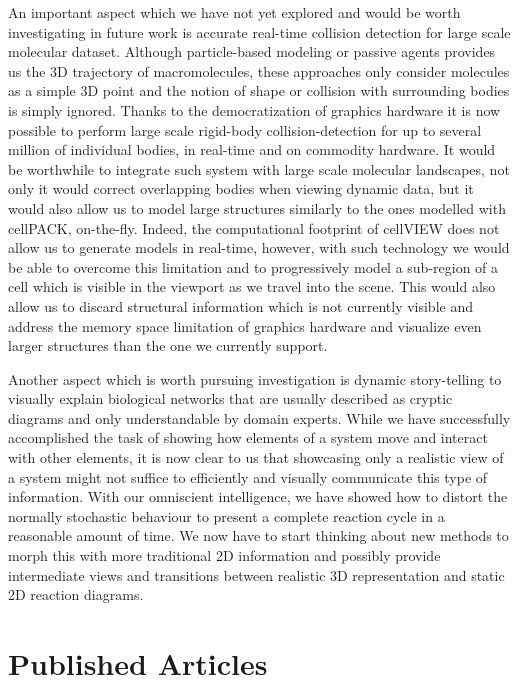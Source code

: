 An important aspect which we have not yet explored and would be worth investigating in future work is accurate real-time collision detection for large scale molecular dataset.
Although particle-based modeling or passive agents provides us the 3D trajectory of macromolecules, these approaches only consider molecules as a simple 3D point and the notion of shape or collision with surrounding bodies is simply ignored.
Thanks to the democratization of graphics hardware it is now possible to perform large scale rigid-body collision-detection for up to several million of individual bodies, in real-time and on commodity hardware.
It would be worthwhile to integrate such system with large scale molecular landscapes, not only it would correct overlapping bodies when viewing dynamic data, but it would also allow us to model large structures similarly to the ones modelled with cellPACK, on-the-fly.
Indeed, the computational footprint of cellVIEW does not allow us to generate models in real-time, however, with such technology we would be able to overcome this limitation and to progressively model a sub-region of a cell which is visible in the viewport as we travel into the scene.
This would also allow us to discard structural information which is not currently visible and address the memory space limitation of graphics hardware and visualize even larger structures than the one we currently support.

Another aspect which is worth pursuing investigation is dynamic story-telling to visually explain biological networks that are usually described as cryptic diagrams and only understandable by domain experts.
While we have successfully accomplished the task of showing how elements of a system move and interact with other elements, it is now clear to us that showcasing only a realistic view of a system might not suffice to efficiently and visually communicate this type of information.
With our omniscient intelligence, we have showed how to distort the normally stochastic behaviour to present a complete reaction cycle in a reasonable amount of time.
We now have to start thinking about new methods to morph this with more traditional 2D information and possibly provide intermediate views and transitions between realistic 3D representation and static 2D reaction diagrams.

\chapter{Published Articles}